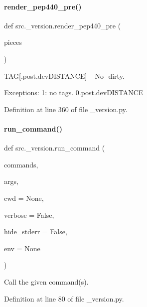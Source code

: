 \paragraph{\texorpdfstring{render\+\_\+pep440\+\_\+pre()}{render\_pep440\_pre()}}
{\footnotesize\ttfamily def src.\+\_\+version.\+render\+\_\+pep440\+\_\+pre (\begin{DoxyParamCaption}\item[{}]{pieces }\end{DoxyParamCaption})}



T\+AG\mbox{[}.post.\+dev\+D\+I\+S\+T\+A\+N\+CE\mbox{]} -- No -\/dirty. 

Exceptions\+: 1\+: no tags. 0.\+post.\+dev\+D\+I\+S\+T\+A\+N\+CE 

Definition at line 360 of file \+\_\+version.\+py.

\mbox{\label{namespacesrc_1_1__version_a07869f13dacbb2c9659c38961e969824}} 
\paragraph{\texorpdfstring{run\+\_\+command()}{run\_command()}}
{\footnotesize\ttfamily def src.\+\_\+version.\+run\+\_\+command (\begin{DoxyParamCaption}\item[{}]{commands,  }\item[{}]{args,  }\item[{}]{cwd = {\ttfamily None},  }\item[{}]{verbose = {\ttfamily False},  }\item[{}]{hide\+\_\+stderr = {\ttfamily False},  }\item[{}]{env = {\ttfamily None} }\end{DoxyParamCaption})}



Call the given command(s). 



Definition at line 80 of file \+\_\+version.\+py.

\mbox{\label{namespacesrc_1_1__version_a8ab6a4b8a5612bba9d90c884f50fce13}} 

